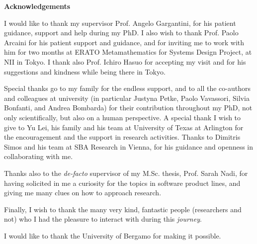 \newenvironment{acknowledgements}%
{\clearpage\thispagestyle{empty}\null\vfill\begin{center}%
		\bfseries Acknowledgements\end{center}}%
{\vfill\null}
\begin{acknowledgements}
	I would like to thank my supervisor Prof. Angelo Gargantini, for his patient guidance, support and help during my PhD. 
	I also wish to thank Prof. Paolo Arcaini for his patient support and guidance, and for inviting me to work with him for two months at ERATO Metamathematics for Systems Design Project, at NII in Tokyo. I thank also Prof. Ichiro Hasuo for accepting my visit and for his suggestions and kindness while being there in Tokyo.

	Special thanks go to my family for the endless support, and to all the co-authors and colleagues at university (in particular Justyna Petke, Paolo Vavassori, Silvia Bonfanti, and Andrea Bombarda)  for their contribution throughout my PhD, not only scientifically, but also on a human perspective.
	A special thank I wish to give to Yu Lei, his family and his team at University of Texas at Arlington for the encouragement and the support in research activities.
	Thanks to Dimitris Simos and his team at SBA Research in Vienna, for his guidance and openness in collaborating with me.
	
	Thanks also to the \textit{de-facto} supervisor of my M.Sc. thesis, Prof. Sarah Nadi, for having solicited in me a curiosity for the topics in software product lines, and giving me many clues on how to approach research.
	
	Finally, I wish to thank the many very kind, fantastic people (researchers and not) who I had the pleasure to interact with during this \textit{journey}.
	
	I would like to thank the University of Bergamo for making it possible.
\end{acknowledgements}

\clearpage

\tableofcontents %

\clearpage

\listoffigures %

\clearpage


